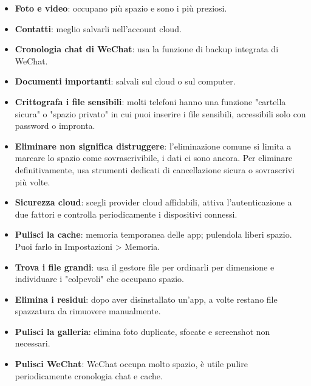 
\begin{itemize}
  \item \textbf{Foto e video}: occupano più spazio e sono i più preziosi.
  \item \textbf{Contatti}: meglio salvarli nell'account cloud.
  \item \textbf{Cronologia chat di WeChat}: usa la funzione di backup integrata di WeChat.
  \item \textbf{Documenti importanti}: salvali sul cloud o sul computer.
\end{itemize}


\begin{itemize}
  \item \textbf{Crittografa i file sensibili}: molti telefoni hanno una funzione "cartella sicura" o "spazio privato" in cui puoi inserire i file sensibili, accessibili solo con password o impronta.
  \item \textbf{Eliminare non significa distruggere}: l'eliminazione comune si limita a marcare lo spazio come sovrascrivibile, i dati ci sono ancora. Per eliminare definitivamente, usa strumenti dedicati di cancellazione sicura o sovrascrivi più volte.
  \item \textbf{Sicurezza cloud}: scegli provider cloud affidabili, attiva l'autenticazione a due fattori e controlla periodicamente i dispositivi connessi.
\end{itemize}


\begin{itemize}
  \item \textbf{Pulisci la cache}: memoria temporanea delle app; pulendola liberi spazio. Puoi farlo in Impostazioni > Memoria.
  \item \textbf{Trova i file grandi}: usa il gestore file per ordinarli per dimensione e individuare i "colpevoli" che occupano spazio.
  \item \textbf{Elimina i residui}: dopo aver disinstallato un'app, a volte restano file spazzatura da rimuovere manualmente.
  \item \textbf{Pulisci la galleria}: elimina foto duplicate, sfocate e screenshot non necessari.
  \item \textbf{Pulisci WeChat}: WeChat occupa molto spazio, è utile pulire periodicamente cronologia chat e cache.
\end{itemize}

